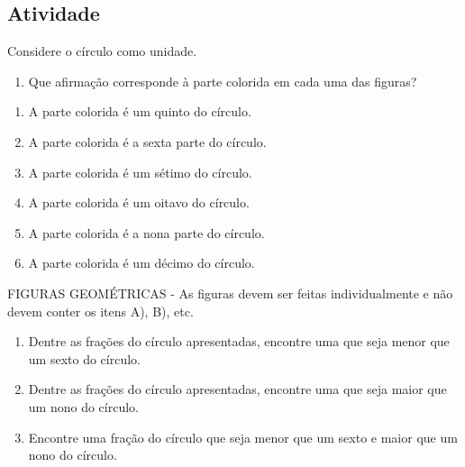 \documentclass[a4,12pt]{book}
\begin{document}
\subsection{Atividade}







Considere o círculo como unidade.
\begin{enumerate} [\quad a)] %
  \item      Que afirmação corresponde à parte colorida em cada uma das figuras?
\end{enumerate} %
\mbox{} \newline
\begin{enumerate} [\quad a)] %
  \item    	A parte colorida é um quinto do círculo.
  \item    	A parte colorida é a sexta parte do círculo.
  \item    	A parte colorida é um sétimo do círculo.
  \item    	A parte colorida é um oitavo do círculo.
  \item    	A parte colorida é a nona parte do círculo.
  \item    	A parte colorida é um décimo do círculo.
\end{enumerate} %
\mbox{} \newline  \begin{imagem*}[breakable]{}{}   FIGURAS GEOMÉTRICAS - As figuras devem ser feitas individualmente e não devem conter os itens A), B), etc.
\end{imagem*}\mbox{} \newline
\begin{enumerate} [\quad a)] %
  \item     Dentre as frações do círculo apresentadas, encontre uma que seja menor que um sexto do círculo.
  \item     Dentre as frações do círculo apresentadas, encontre uma que seja maior que um nono do círculo.
  \item     Encontre uma fração do círculo que seja menor que um sexto e maior que um nono do círculo.
\end{enumerate} %
\end{document}
